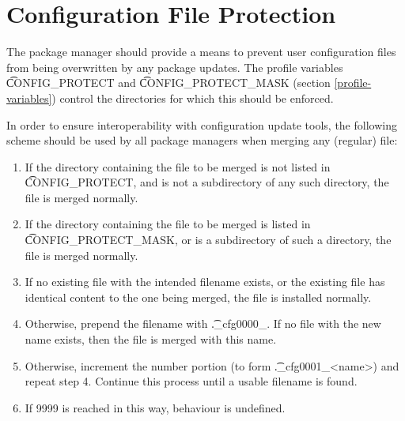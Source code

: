 \chapter{Configuration File Protection}
\label{config-protect}

The package manager should provide a means to prevent user configuration files from being
overwritten by any package updates. The profile variables \t{CONFIG\_PROTECT} and
\t{CONFIG\_PROTECT\_MASK} (section \ref{profile-variables}) control the directories for which this
should be enforced.

In order to ensure interoperability with configuration update tools, the following scheme should be
used by all package managers when merging any (regular) file:

\begin{enumerate}
\item If the directory containing the file to be merged is not listed in \t{CONFIG\_PROTECT}, and is
    not a subdirectory of any such directory, the file is merged normally.
\item If the directory containing the file to be merged is listed in \t{CONFIG\_PROTECT\_MASK}, or
    is a subdirectory of such a directory, the file is merged normally.
\item If no existing file with the intended filename exists, or the existing file has identical
    content to the one being merged, the file is installed normally.
\item Otherwise, prepend the filename with \t{.\_cfg0000\_}. If no file with the new name exists,
    then the file is merged with this name.
\item Otherwise, increment the number portion (to form \t{.\_cfg0001\_<name>}) and repeat step 4.
    Continue this process until a usable filename is found.
\item If 9999 is reached in this way, behaviour is undefined.
\end{enumerate}

